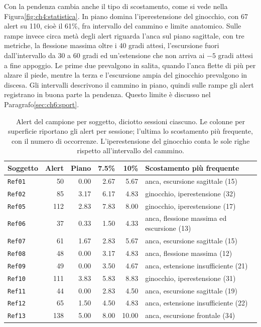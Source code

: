 Con la pendenza cambia anche il tipo di scostamento, come si vede nella
Figura\ref{fig:ch4:statistica}. In piano domina l'iperestensione del ginocchio,
con 67 alert su 110, cioè il 61\%, fra intervallo del cammino e limite anatomico.
Sulle rampe invece circa metà degli alert riguarda l'anca sul piano sagittale, con
tre metriche, la flessione massima oltre i 40 gradi attesi, l'escursione fuori
dall'intervallo da 30 a 60 gradi ed un'estensione che non arriva ai $-5$ gradi
attesi a fine appoggio. Le prime due prevalgono in salita, quando l'anca flette di
più per alzare il piede, mentre la terza e l'escursione ampia del ginocchio
prevalgono in discesa. Gli intervalli descrivono il cammino in piano, quindi sulle
rampe gli alert registrano in buona parte la pendenza. Questo limite è discusso nel
Paragrafo\ref{sec:ch6:sport}.

\begin{table}[htbp]
\centering
\caption{Alert del campione per soggetto, diciotto sessioni ciascuno. Le colonne
per superficie riportano gli alert per sessione; l'ultima lo scostamento più
frequente, con il numero di occorrenze. L'iperestensione del ginocchio conta le
sole righe rispetto all'intervallo del cammino.}
\label{tab:ch4:alert-soggetti}
\small
\begin{tabular}{lrrrrl}
\toprule
\textbf{Soggetto} & \textbf{Alert} & \textbf{Piano} & \textbf{7.5\%} &
  \textbf{10\%} & \textbf{Scostamento più frequente} \\
\midrule
\texttt{Ref01} &  50 & 0.00 & 2.67 &  5.67 & anca, escursione sagittale (15) \\
\texttt{Ref02} &  85 & 3.17 & 6.17 &  4.83 & ginocchio, iperestensione (32) \\
\texttt{Ref05} & 112 & 2.83 & 7.83 &  8.00 & ginocchio, iperestensione (17) \\
\texttt{Ref06} &  37 & 0.33 & 1.50 &  4.33 & anca, flessione massima ed escursione (13) \\
\texttt{Ref07} &  61 & 1.67 & 2.83 &  5.67 & anca, escursione sagittale (15) \\
\texttt{Ref08} &  48 & 0.00 & 3.17 &  4.83 & anca, flessione massima (12) \\
\texttt{Ref09} &  49 & 0.00 & 3.50 &  4.67 & anca, estensione insufficiente (21) \\
\texttt{Ref10} & 111 & 3.83 & 5.83 &  8.83 & ginocchio, iperestensione (31) \\
\texttt{Ref11} &  44 & 0.00 & 2.83 &  4.50 & anca, escursione sagittale (19) \\
\texttt{Ref12} &  65 & 1.50 & 4.50 &  4.83 & anca, estensione insufficiente (22) \\
\texttt{Ref13} & 138 & 5.00 & 8.00 & 10.00 & anca, escursione frontale (34) \\
\bottomrule
\end{tabular}
\end{table}

